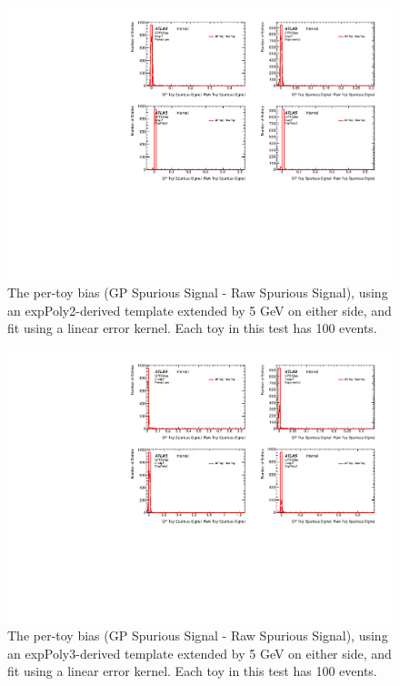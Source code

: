 \begin{figure} 
\begin{center}
  \includegraphics[width=\textwidth]{figures/background/gpr/validation/linear/ToyTest_FitSigBiases_lowpT_100_noSig}   
\caption{The per-toy bias (GP Spurious Signal - Raw Spurious Signal), using an expPoly2-derived template extended by 5 GeV on either side, and fit using a linear error kernel. Each toy in this test has 100 events.}
\label{fig:bias_linearkernel_lowpt_100_noSig}
\end{center}
\end{figure}

\begin{figure} 
\begin{center}
  \includegraphics[width=\textwidth]{figures/background/gpr/validation/linear/ToyTest_FitSigBiases_medpT_100_noSig}   
\caption{The per-toy bias (GP Spurious Signal - Raw Spurious Signal), using an expPoly3-derived template extended by 5 GeV on either side, and fit using a linear error kernel. Each toy in this test has 100 events.}
\label{fig:bias_linearkernel_medpt_100_noSig}
\end{center}
\end{figure}

